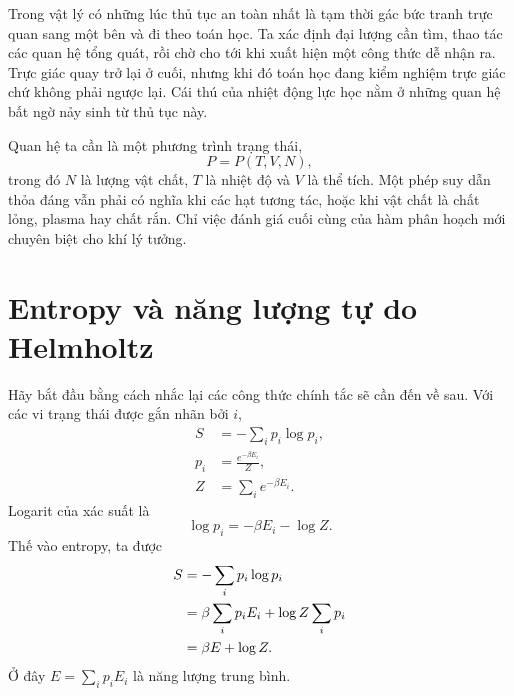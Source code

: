 Trong vật lý có những lúc thủ tục an toàn nhất là tạm thời gác bức tranh trực quan sang một bên và đi theo toán học. Ta xác định đại lượng cần tìm, thao tác các quan hệ tổng quát, rồi chờ cho tới khi xuất hiện một công thức dễ nhận ra. Trực giác quay trở lại ở cuối, nhưng khi đó toán học đang kiểm nghiệm trực giác chứ không phải ngược lại. Cái thú của nhiệt động lực học nằm ở những quan hệ bất ngờ nảy sinh từ thủ tục này.

Quan hệ ta cần là một phương trình trạng thái,
\begin{equation}
 P=P(T,V,N),
 \label{eq:sm5-equation-of-state-target}
\end{equation}
trong đó \(N\) là lượng vật chất, \(T\) là nhiệt độ và \(V\) là thể tích. Một phép suy dẫn thỏa đáng vẫn phải có nghĩa khi các hạt tương tác, hoặc khi vật chất là chất lỏng, plasma hay chất rắn. Chỉ việc đánh giá cuối cùng của hàm phân hoạch mới chuyên biệt cho khí lý tưởng.

\section{Entropy và năng lượng tự do Helmholtz}

Hãy bắt đầu bằng cách nhắc lại các công thức chính tắc sẽ cần đến về sau. Với các vi trạng thái được gắn nhãn bởi \(i\),
\begin{equation}
 \begin{aligned}
 S&=-\sum_i p_i\log p_i,\\
 p_i&=\frac{e^{-\beta E_i}}{Z},\\
 Z&=\sum_i e^{-\beta E_i}.
 \end{aligned}
 \label{eq:sm5-canonical-definitions}
\end{equation}
Logarit của xác suất là
\begin{equation}
 \log p_i=-\beta E_i-\log Z.
 \label{eq:sm5-log-probability}
\end{equation}
Thế vào entropy, ta được
\begin{align}
 S
 &=-\sum_i p_i\log p_i \notag\\
 &=\beta\sum_i p_iE_i+\log Z\sum_i p_i \notag\\
 &=\beta E+\log Z.
 \label{eq:sm5-entropy-log-z}
\end{align}
Ở đây \(E=\sum_i p_iE_i\) là năng lượng trung bình.

\begin{classroomqa}
\end{classroomqa}

